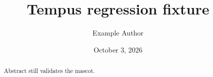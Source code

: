 \documentclass[nobanner]{tempusreport}
\title{Tempus regression fixture}
\author{Example Author}\date{October 3, 2026}
\begin{document}
\maketitle
\begin{abstract}Abstract still validates the mascot.\end{abstract}
\end{document}
